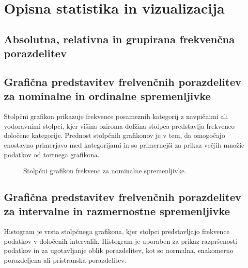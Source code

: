 \chapter{Opisna statistika in vizualizacija}

\section{Absolutna, relativna in grupirana frekvenčna porazdelitev}

\section{Grafična predstavitev frelvenčnih porazdelitev za nominalne in ordinalne spremenljivke}

Stolpčni grafikon prikazuje frekvence posameznih kategorij z navpičnimi ali vodoravnimi stolpci, kjer višina oziroma dolžina stolpca predstavlja frekvenco določene kategorije. Prednost stolpčnih grafikonov je v tem, da omogočajo enostavno primerjavo med kategorijami in so primernejši za prikaz večjih množic podatkov od tortnega grafikona.

\begin{figure}
    \centering
    \caption{Stolpčni grafikon frekvenc za nominalne spremenljivke.}
    \end{figure}

\section{Grafična predstavitev frelvenčnih porazdelitev za intervalne in razmernostne spremenljivke}

Histogram je vrsta stolpčnega grafikona, kjer stolpci predstavljajo frekvence podatkov v določenih intervalih. Histogram je uporaben za prikaz razpršenosti podatkov in za ugotavljanje oblik porazdelitev, kot so normalna, enakomerno porazdeljena ali pristranska porazdelitev.

